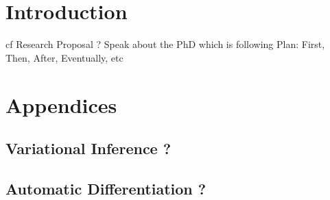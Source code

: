 \documentclass[twoside,10pt,openany,a4paper]{rapport}
\begin{document}
\mainmatter


\chapter{Introduction}
cf Research Proposal ?
Speak about the PhD which is following
Plan: First, Then, After, Eventually, etc























\appendix
\chapter*{Appendices}
\renewcommand{\thesection}{\Alph{section}}
\section{Variational Inference ?}
\section{Automatic Differentiation ?}




\end{document}
